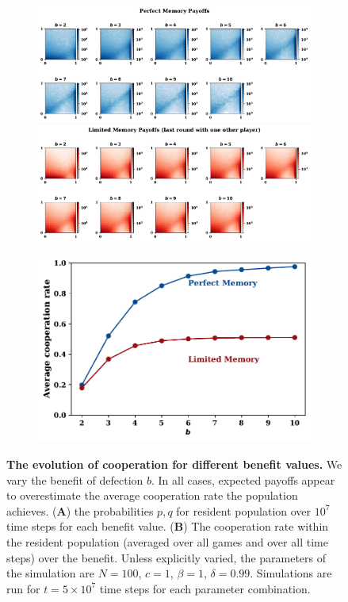 \documentclass[11pt]{article}
\theoremstyle{plainCl1}
\theoremstyle{plainCl2}
\begin{document}
\begin{figure}[!htbp]
  \centering
  \begin{subfigure}{.5\textwidth}
    \centering
    \includegraphics[width=\textwidth]{static/expected_for_beta.pdf}
    \includegraphics[width=\textwidth]{static/stochastic_for_beta.pdf}
  \end{subfigure}%
  \begin{subfigure}{.5\textwidth}
    \centering
    \includegraphics[width=\textwidth]{static/cooperation_rate_over_b.pdf}
  \end{subfigure}
  \caption{{\bf The evolution of cooperation for different benefit values.} 
  We vary the benefit of defection $b$. In all cases, expected payoffs appear to
  overestimate the average cooperation rate the population achieves. ({\bf A})
  the probabilities \(p, q\) for resident population over \(10^7\) time steps
  for each benefit value. ({\bf B}) The cooperation rate within the resident
  population (averaged over all games and over all time steps) over the benefit.
  Unless explicitly varied, the parameters of the simulation are $N\!=\!100$,
  $c\!=\!1$, $\beta\!=\!1$, $\delta\!=\!0.99$. Simulations are run for
  $t\!=\!5\times 10^7$ time steps for each parameter
  combination.}\label{fig:cooperation_rate_over_benefit}
\end{figure}
\end{document}
